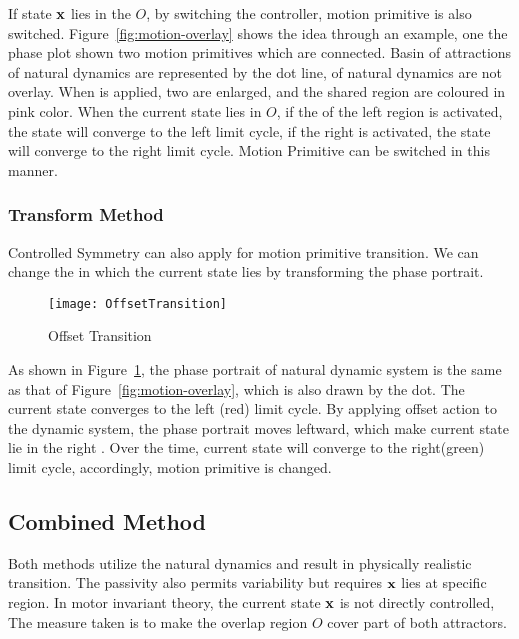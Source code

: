 If  state $\mathbf{x}$ lies in the $O$, by switching the \cpg controller, motion primitive is also switched.
Figure~\ref{fig:motion-overlay} shows the idea through an example, one the phase plot shown two motion primitives which are connected.
Basin of attractions of natural dynamics are represented by the dot line, \boa of natural dynamics are not overlay.
When \cpg is applied, two \boa are enlarged, and the shared region are coloured in pink color.
When the current state lies in $O$, if the \cpg of the left region is activated, the state will converge to the left limit cycle,
if the right \cpg is activated, the state will converge to the right limit cycle.
Motion Primitive can be switched in this manner.






\subsubsection*{Transform Method}
Controlled Symmetry can also apply for motion primitive transition.
We can change the \boa in which the current state lies by transforming the phase portrait.

\begin{figure}[!htbp]
  \begin{center}
      \texttt{[image: OffsetTransition]}
    \caption{Offset Transition}
    \label{fig:transform-offset}
  \end{center}
\end{figure}




As shown in Figure~\ref{fig:transform-offset}, the phase portrait of natural dynamic system is the same as that of Figure~\ref{fig:motion-overlay}, which is also drawn by the dot.
The current state converges to the left (red) limit cycle.
By applying offset action to the dynamic system, the phase portrait  moves leftward, which make current state lie in the right \boa.
Over the time, current state will converge to the right(green) limit cycle, accordingly, motion primitive is changed.







\subsection{Combined Method}
Both methods utilize the natural dynamics and  result in physically realistic transition.
The passivity also permits variability but requires $\mathbf{x}$ lies at specific region.
In motor invariant theory, the current state $\mathbf{x}$ is not directly controlled,
The measure taken is to make the overlap region $O$ cover part of both attractors.

